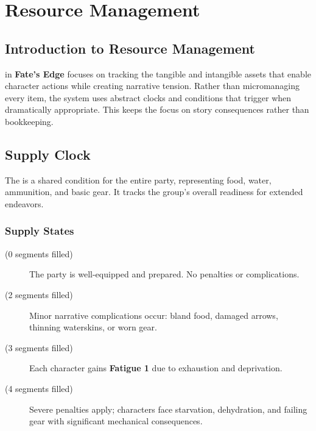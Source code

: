 \chapter{Resource Management}
\label{chap:resource-management}

\section{Introduction to Resource Management}
\label{sec:resource-intro}

 in \textbf{Fate's Edge} focuses on tracking the tangible and intangible assets that enable character actions while creating narrative tension. Rather than micromanaging every item, the system uses abstract clocks and conditions that trigger when dramatically appropriate. This keeps the focus on story consequences rather than bookkeeping. 

\section{Supply Clock}
\label{sec:supply-clock}

The  is a shared condition for the entire party, representing food, water, ammunition, and basic gear. It tracks the group's overall readiness for extended endeavors. 

\subsection{Supply States}
\label{subsec:supply-states}

\begin{description}
\item[ (0 segments filled)] The party is well-equipped and prepared. No penalties or complications. 
\item[ (2 segments filled)] Minor narrative complications occur: bland food, damaged arrows, thinning waterskins, or worn gear. 
\item[ (3 segments filled)] Each character gains \textbf{Fatigue 1} due to exhaustion and deprivation. 
\item[ (4 segments filled)] Severe penalties apply; characters face starvation, dehydration, and failing gear with significant mechanical consequences. 
\end{description}

